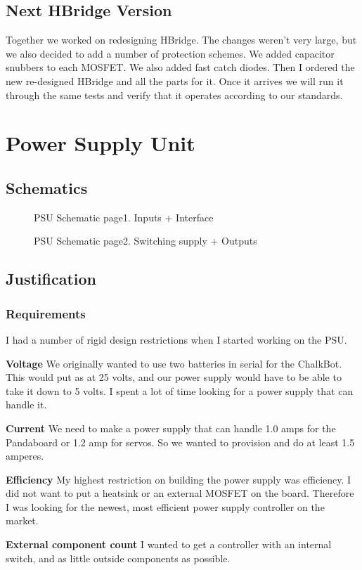 \documentclass[12pt]{article}
\newcommand{\figuremine}[2]{
\begin{figure}[H]
\noindent\makebox[\textwidth]{
 \texttt{[image: \#1]}}
 \caption{#2}
\end{figure}
}
\begin{document}
\subsection{Next HBridge Version}
Together we worked on redesigning HBridge. The changes weren't very large, but we also decided to add a number of protection schemes. We added capacitor snubbers to each MOSFET. We also added fast catch diodes. Then I ordered the new re-designed HBridge and all the parts for it. Once it arrives we will run it through the same tests and verify that it operates according to our standards.
\newpage
\section{Power Supply Unit}
\subsection{Schematics}
\figuremine{~/ece445/Chalk-Bot/Hardware/Power_board/page1.png}{PSU Schematic page1. Inputs + Interface}
\figuremine{~/ece445/Chalk-Bot/Hardware/Power_board/page2.png}{PSU Schematic page2. Switching supply + Outputs}
\subsection{Justification}
\subsubsection{Requirements}
I had a number of rigid design restrictions when I started working on the PSU. 
\begin{description}
\item{\bf Voltage} We originally wanted to use two batteries in serial for the ChalkBot. This would put as at 25 volts, and our power supply would have to be able to take it down to 5 volts. I spent a lot of time looking for a power supply that can handle it.
\item{\bf Current} We need to make a power supply that can handle 1.0 amps for the Pandaboard or 1.2 amp for servos. So we wanted to provision and do at least 1.5 amperes.
\item{\bf Efficiency} My highest restriction on building the power supply was efficiency. I did not want to put a heatsink or an external MOSFET on the board. Therefore I was looking for the newest, most efficient power supply controller on the market.
\item{\bf External component count} I wanted to get a controller with an internal switch, and as little outside components as possible.
\end{description}
\end{document}
